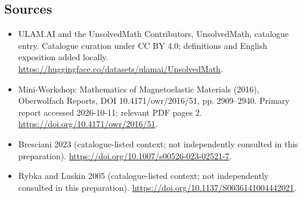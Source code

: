 \documentclass[11pt]{article}
\begin{document}
\subsection{Sources}
\begin{itemize}
\item[\hypertarget{source:statement:1}{S1}] ULAM.AI and the UnsolvedMath Contributors, UnsolvedMath, catalogue entry. Catalogue curation under CC BY 4.0; definitions and English exposition added locally.
\url{https://huggingface.co/datasets/ulamai/UnsolvedMath}.
\item[\hypertarget{source:statement:2}{S2}] Mini-Workshop: Mathematics of Magnetoelastic Materials (2016), Oberwolfach Reports, DOI 10.4171/owr/2016/51, pp. 2909--2940. Primary report accessed 2026-10-11; relevant PDF pages 2.
\url{https://doi.org/10.4171/owr/2016/51}.
\item[\hypertarget{source:statement:3}{S3}] Bresciani 2023 (catalogue-listed context; not independently consulted in this preparation).
\url{https://doi.org/10.1007/s00526-023-02521-7}.
\item[\hypertarget{source:statement:4}{S4}] Rybka and Luskin 2005 (catalogue-listed context; not independently consulted in this preparation).
\url{https://doi.org/10.1137/S0036141004442021}.
\end{itemize}
\label{end:statement}
\end{document}
